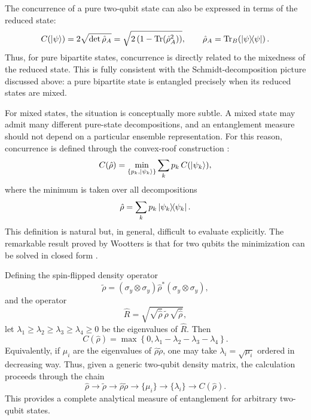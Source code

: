 The concurrence of a pure two-qubit state can also be expressed in terms of the reduced state:
\begin{equation}
	C(\ket{\psi})
	=
	2\sqrt{\det \hat \rho_A}
	=
	\sqrt{2\left(1-\Tr(\hat \rho_A^2)\right)},
	\qquad
	\hat \rho_A=\Tr_B\!\left(\dyad{\psi}{\psi}\right).
	\label{eq:intro_qm_pure_state_concurrence_reduced_density}
\end{equation}
Thus, for pure bipartite states, concurrence is directly related to the mixedness of the reduced state. This is fully consistent with the Schmidt-decomposition picture discussed above: a pure bipartite state is entangled precisely when its reduced states are mixed.

For mixed states, the situation is conceptually more subtle. A mixed state may admit many different pure-state decompositions, and an entanglement measure should not depend on a particular ensemble representation. For this reason, concurrence is defined through the convex-roof construction \cite{Wootters98}:
\begin{equation}
	C(\hat \rho)
	=
	\min_{\{p_k,\ket{\psi_k}\}}
	\sum_k p_k\, C(\ket{\psi_k}),
	\label{eq:intro_qm_mixed_state_concurrence_convex_roof}
\end{equation}
where the minimum is taken over all decompositions
\begin{equation}
	\hat \rho=\sum_k p_k \dyad{\psi_k}{\psi_k}.
	\label{eq:intro_qm_mixed_state_concurrence_decomposition}
\end{equation}
This definition is natural but, in general, difficult to evaluate explicitly. The remarkable result proved by Wootters is that for two qubits the minimization can be solved in closed form \cite{Wootters98}.

Defining the spin-flipped density operator
\begin{equation}
	\tilde{\rho}
	=
	(\sigma_y\otimes\sigma_y)\hat \rho^*(\sigma_y\otimes\sigma_y),
	\label{eq:intro_qm_spin_flipped_density_operator}
\end{equation}
and the operator
\begin{equation}
	\hat R
	=
	\sqrt{
		\sqrt{\hat \rho}\,
		\tilde{\rho}\,
		\sqrt{\hat \rho}
	},
	\label{eq:intro_qm_wootters_R_operator}
\end{equation}
let $\lambda_1\geq \lambda_2\geq \lambda_3\geq \lambda_4\geq 0$ be the eigenvalues of $\hat R$. Then
\begin{equation}
	C(\hat \rho)
	=
	\max\left\{0,\lambda_1-\lambda_2-\lambda_3-\lambda_4\right\}.
	\label{eq:intro_qm_wootters_concurrence_formula}
\end{equation}
Equivalently, if $\mu_i$ are the eigenvalues of $\hat \rho\tilde{\rho}$, one may take $\lambda_i=\sqrt{\mu_i}$ ordered in decreasing way. Thus, given a generic two-qubit density matrix, the calculation proceeds through the chain
\begin{equation}
	\hat \rho
	\longrightarrow
	\tilde{\rho}
	\longrightarrow
	\hat \rho \tilde{\rho}
	\longrightarrow
	\{\mu_i\}
	\longrightarrow
	\{\lambda_i\}
	\longrightarrow
	C(\hat \rho).
	\label{eq:intro_qm_concurrence_algorithm}
\end{equation}
This provides a complete analytical measure of entanglement for arbitrary two-qubit states.


